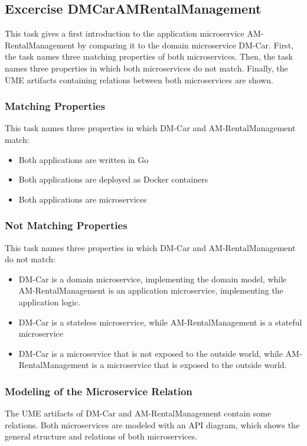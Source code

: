 \subsection{Excercise DMCarAMRentalManagement}
This task gives a first introduction to the application microservice AM-RentalManagement by comparing it to the domain microservice DM-Car.
First, the task names three matching properties of both microservices.
Then, the task names three properties in which both microservices do not match.
Finally, the UME artifacts containing relations between both microservices are shown.

\subsubsection*{Matching Properties}
This task names three properties in which DM-Car and AM-RentalManagement match:
\begin{itemize}
    \item Both applications are written in Go
    \item Both applications are deployed as Docker containers
    \item Both applications are microservices
\end{itemize}
\subsubsection*{Not Matching Properties}
This task names three properties in which DM-Car and AM-RentalManagement do not match:
\begin{itemize}
    \item DM-Car is a domain microservice, implementing the domain model, while AM-RentalManagement is an application microservice, implementing the application logic.
    \item DM-Car is a stateless microservice, while AM-RentalManagement is a stateful microservice %
    \item DM-Car is a microservice that is not exposed to the outside world, while AM-RentalManagement is a microservice that is exposed to the outside world.
\end{itemize}

\subsubsection*{Modeling of the Microservice Relation}
The UME artifacts of DM-Car and AM-RentalManagement contain some relations.
Both microservices are modeled with an API diagram, which shows the general structure and relations of both microservices.

